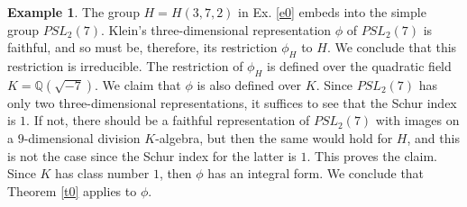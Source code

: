 \documentclass{article}
\theoremstyle{definition}
\newtheorem{ex}[prop]{Example}
\begin{document}
\begin{ex}\label{ex56}
    The group $H=H(3,7,2)$ in Ex. \ref{e0} embeds into the simple group 
    $PSL_2(7)$. Klein's three-dimensional representation $\phi$
    of $PSL_2(7)$ is faithful, and so must be, therefore, its restriction 
    $\phi_H$ to $H$. We conclude that this restriction is irreducible. The
    restriction of $\phi_H$ is defined over the quadratic  field
    $K=\mathbb{Q}(\sqrt{-7})$. We claim that $\phi$ is also defined 
    over $K$. Since $PSL_2(7)$ has only two three-dimensional representations, 
    it suffices to see that the Schur index is $1$. If not, there should be a 
    faithful representation of $PSL_2(7)$ with images on a $9$-dimensional 
    division $K$-algebra, but then the same would hold for $H$, and this is not
    the case since the Schur index for the latter is $1$. This proves the claim.
    Since $K$ has class number $1$, then $\phi$ has an integral form. We conclude 
    that Theorem \ref{t0} applies to $\phi$.
\end{ex}
\end{document}
